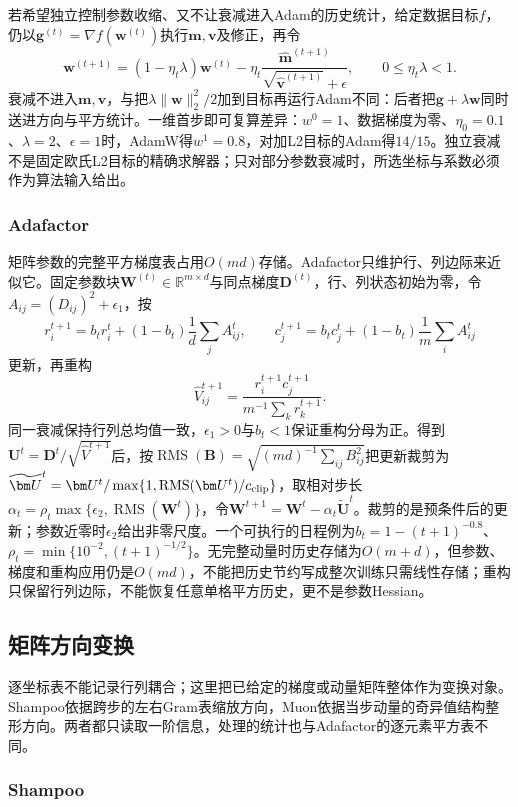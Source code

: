 若希望独立控制参数收缩、又不让衰减进入Adam的历史统计，给定数据目标$f$，仍以$\bm g^{(t)}=\nabla f(\bm w^{(t)})$执行$\bm m,\bm v$及修正，再令
\[
 \bm w^{(t+1)}=(1-\eta_t\lambda)\bm w^{(t)}
 -\eta_t\frac{\widehat{\bm m}^{(t+1)}}{\sqrt{\widehat{\bm v}^{(t+1)}}+\epsilon},
 \qquad 0\leq\eta_t\lambda<1.
\]
衰减不进入$\bm m,\bm v$，与把$\lambda\|\bm w\|_2^2/2$加到目标再运行Adam不同：后者把$\bm g+\lambda\bm w$同时送进方向与平方统计。一维首步即可复算差异：$w^0=1$、数据梯度为零、$\eta_0=0.1$、$\lambda=2$、$\epsilon=1$时，AdamW得$w^1=0.8$，对加L2目标的Adam得$14/15$。独立衰减不是固定欧氏L2目标的精确求解器；只对部分参数衰减时，所选坐标与系数必须作为算法输入给出。

\subsubsection{Adafactor}

矩阵参数的完整平方梯度表占用$O(md)$存储。Adafactor只维护行、列边际来近似它。固定参数块$\bm W^{(t)}\in\mathbb R^{m\times d}$与同点梯度$\bm D^{(t)}$，行、列状态初始为零，令$A_{ij}=(D_{ij})^2+\epsilon_1$，按
\[
 r_i^{t+1}=b_t r_i^t+(1-b_t)\frac1d\sum_jA_{ij}^t,\qquad
 c_j^{t+1}=b_t c_j^t+(1-b_t)\frac1m\sum_iA_{ij}^t
\]
更新，再重构
\[
 \widehat V_{ij}^{t+1}
 =\frac{r_i^{t+1}c_j^{t+1}}{m^{-1}\sum_k r_k^{t+1}}.
\]
同一衰减保持行列总均值一致，$\epsilon_1>0$与$b_t<1$保证重构分母为正。得到$\bm U^t=\bm D^t/\sqrt{\widehat V^{t+1}}$后，按$\operatorname{RMS}(\bm B)=\sqrt{(md)^{-1}\sum_{ij}B_{ij}^2}$把更新裁剪为$\widetilde{\bm U}^t=\bm U^t/\max\{1,\operatorname{RMS}(\bm U^t)/c_{\rm clip}\}$，取相对步长$\alpha_t=\rho_t\max\{\epsilon_2,\operatorname{RMS}(\bm W^t)\}$，令$\bm W^{t+1}=\bm W^t-\alpha_t\widetilde{\bm U}^t$。裁剪的是预条件后的更新；参数近零时$\epsilon_2$给出非零尺度。一个可执行的日程例为$b_t=1-(t+1)^{-0.8}$、$\rho_t=\min\{10^{-2},(t+1)^{-1/2}\}$。无完整动量时历史存储为$O(m+d)$，但参数、梯度和重构应用仍是$O(md)$，不能把历史节约写成整次训练只需线性存储；重构只保留行列边际，不能恢复任意单格平方历史，更不是参数Hessian。

\subsection{矩阵方向变换}

逐坐标表不能记录行列耦合；这里把已给定的梯度或动量矩阵整体作为变换对象。Shampoo依据跨步的左右Gram表缩放方向，Muon依据当步动量的奇异值结构整形方向。两者都只读取一阶信息，处理的统计也与Adafactor的逐元素平方表不同。

\subsubsection{Shampoo}

